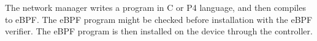 







The network manager writes a program in C or P4 language, and then compiles to eBPF. The eBPF program might be checked before installation with the eBPF verifier. The eBPF program is then installed on the device through the controller.

